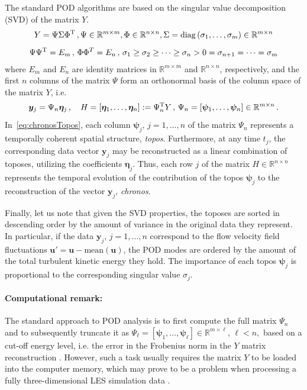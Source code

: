 The standard POD algorithms are based on the singular value decomposition (SVD) of the matrix $Y$. 
\begin{equation}
\label{eq:svdY}
\begin{array}{*1{>{\displaystyle}c}}
    Y = \Psi \Sigma \Phi^{\transp}\,,\Psi \in \mathbb{R}^{m\times m}, \Phi\in\mathbb{R}^{n\times n}, \Sigma = \mathrm{diag}\,(\sigma_{1},\dots,\sigma_{m}) \in \mathbb{R}^{m\times n}\\[0.3cm]
    \Psi\Psi^{\transp} = E_{m}\,,\,\Phi\Phi^{T} = E_{n}\,,\,\sigma_{1}\geq\sigma_{2}\geq\dots\geq\sigma_{n} > 0 = \sigma_{n+1} = \dots = \sigma_{m}
\end{array}    
\end{equation}
where $E_{m}$ and $E_{n}$ are identity matrices in $\mathbb{R}^{m\times m}$ and $\mathbb{R}^{n\times n}$, respectively, and the first $n$ columns of the matrix $\Psi$ form an orthonormal basis of the column space of the matrix $Y$, i.e.
\begin{equation}
\label{eq:chronosTopos}
    \bm{y}_{j} = \Psi_{n}\bm{\eta}_{j}\,,\quad H = \left[\bm{\eta}_{1},\dots,\bm{\eta}_{n}\right]:= \Psi_{n}^{\mathrm{T}} Y\,,\,\Psi_{n} = \left[\bm{\psi}_{1},\dots,\bm{\psi}_{n} \right]\in\mathbb{R}^{m\times n}\,.
\end{equation}
In~\eqref{eq:chronosTopos}, each column $\bm{\psi}_{j},\,j=1,\dots,n$ of the matrix $\Psi_{n}$ represents a temporally coherent spatial structure, \textit{topos}. Furthermore, at any time $t_{j}$, the corresponding data vector $\bm{y}_{j}$ may be reconstructed as a linear combination of toposes, utilizing the coefficients $\bm{\eta}_{j}$. Thus, each row $j$ of the matrix $H\in\mathbb{R}^{n\times n}$ represents the temporal evolution of the contribution of the topos $\bm{\psi}_{j}$ to the reconstruction of the vector $\bm{y}_{j}$, \textit{chronos}.

Finally, let us note that given the SVD properties, the toposes are sorted in descending order by the amount of variance in the original data they represent. In particular, if the data $\bm{y}_{j},\,j=1,\dots,n$ correspond to the flow velocity field fluctuations $\bm{u}' = \bm{u} - \mathrm{mean}(\bm{u})$, the POD modes are ordered by the amount of the total turbulent kinetic energy they hold. The importance of each topos $\bm{\psi}_{j}$ is proportional to the corresponding singular value $\sigma_{j}$.

\paragraph{Computational remark:} The standard approach to POD analysis is to first compute the full matrix $\Psi_{n}$ and to subsequently truncate {it} as $\Psi_{\ell} = [\bm{\psi}_{1},\dots,\bm{\psi}_{\ell}]\in\mathbb{R}^{m\times \ell},\,{\ell < n,}$ based on a cut-off energy level, i.e. the error in the Frobenius norm in the $Y$ matrix reconstruction \citep{isoz2019,volkwein2013}.  However, such a task usually requires the matrix $Y$ to be loaded into the computer memory, which may prove {to be} a problem when processing a fully three-dimensional LES simulation data \citep{kabir2017}.

